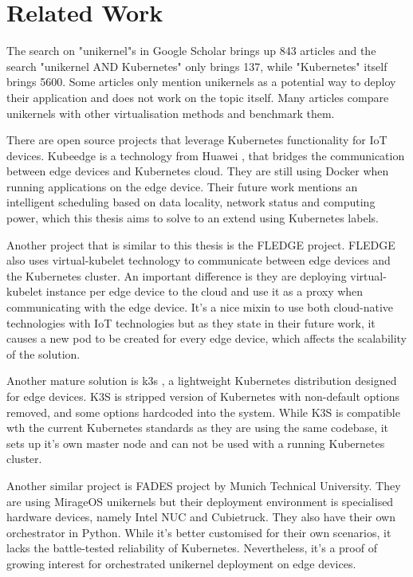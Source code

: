 
\chapter{Related Work}\label{chapter:literature}
 The search on "unikernel"s in Google Scholar brings up 843 articles and the search "unikernel AND Kubernetes" only brings 137, while "Kubernetes" itself brings 5600. Some articles only mention unikernels as a potential way to deploy their application and does not work on the topic itself. Many articles compare unikernels with other virtualisation methods and benchmark them.

There are open source projects that leverage Kubernetes functionality for IoT devices. Kubeedge \cite{kubeedge} is a technology from Huawei , that bridges the communication between edge devices and Kubernetes cloud. They are still using Docker when running applications on the edge device. Their future work mentions an intelligent scheduling based on data locality, network status and computing power, which this thesis aims to solve to an extend using Kubernetes labels.

Another project that is similar to this thesis is the FLEDGE project\cite{fledge}. FLEDGE also uses virtual-kubelet technology to communicate between edge devices and the Kubernetes cluster. An important difference is they are deploying virtual-kubelet instance per edge device to the cloud and use it as a proxy when communicating with the edge device. It's a nice mixin to use both cloud-native technologies with IoT technologies but as they state in their future work, it causes a new pod to be created for every edge device, which affects the scalability of the solution.

Another mature solution is k3s \cite{k3s}, a lightweight Kubernetes distribution designed for edge devices. K3S is stripped version of Kubernetes with non-default options removed, and some options hardcoded into the system. While K3S is compatible wth the current Kubernetes standards as they are using the same codebase, it sets up it's own master node and can not be used with a running Kubernetes cluster.

Another similar project is FADES \cite{fades} project by Munich Technical University. They are using MirageOS unikernels but their deployment environment is specialised hardware devices, namely Intel NUC and Cubietruck. They also have their own orchestrator in Python. While it's better customised for their own scenarios, it lacks the battle-tested reliability of Kubernetes. Nevertheless, it's a proof of growing interest for orchestrated unikernel deployment on edge devices.